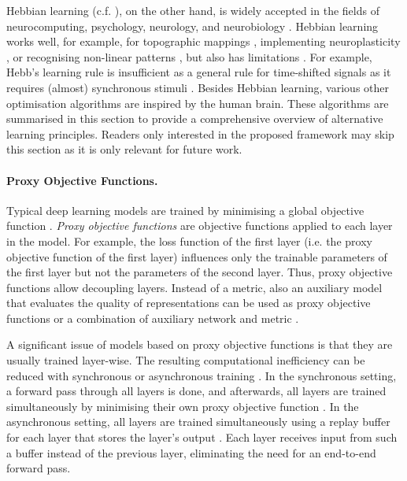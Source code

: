 Hebbian learning (c.f. ), on the other hand, is widely accepted in the fields of neurocomputing, psychology, neurology, and neurobiology .
Hebbian learning works well, for example, for topographic mappings , implementing neuroplasticity , or recognising non-linear patterns , but also has limitations \cite{anderson_biased_1998}.
For example, Hebb's learning rule is insufficient as a general rule for time-shifted signals as it requires (almost) synchronous stimuli .
Besides Hebbian learning, various other optimisation algorithms are inspired by the human brain. These algorithms are summarised in this section to provide a comprehensive overview of alternative learning principles. Readers only interested in the proposed framework may skip this section as it is only relevant for future work.


\paragraph{Proxy Objective Functions.} Typical deep learning models are trained by minimising a global objective function . \emph{Proxy objective functions} \cite{mostafa_deep_2018, marquez_deep_2018, belilovsky_greedy_2019} are objective functions applied to each layer in the model. For example, the loss function of the first layer (i.e. the proxy objective function of the first layer) influences only the trainable parameters of the first layer but not the parameters of the second layer.
Thus, proxy objective functions allow decoupling layers.
Instead of a metric, also an auxiliary model that evaluates the quality of representations can be used as proxy objective functions  or a combination of auxiliary network and metric .

A significant issue of models based on proxy objective functions is that they are usually trained layer-wise.
The resulting computational inefficiency can be reduced with synchronous or asynchronous training \cite{belilovsky_greedy_2019, belilovsky_decoupled_2020}.
In the synchronous setting, a forward pass through all layers is done, and afterwards, all layers are trained simultaneously by minimising their own proxy objective function \cite{belilovsky_greedy_2019}.
In the asynchronous setting, all layers are trained simultaneously using a replay buffer for each layer that stores the layer's output \cite{belilovsky_decoupled_2020}.
Each layer receives input from such a buffer instead of the previous layer, eliminating the need for an end-to-end forward pass.


